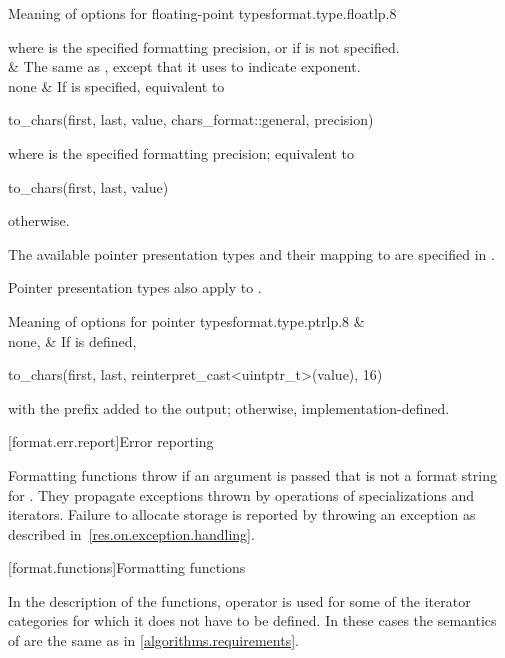 \begin{floattable}{Meaning of  options for floating-point types}{format.type.float}{lp{.8\hsize}}
\begin{codeblock}
\end{codeblock}
where  is the specified formatting precision,
or  if  is not specified.
\\ \rowsep
%
 &
The same as , except that
it uses  to indicate exponent.
\\ \rowsep
%
none &
If  is specified, equivalent to
\begin{codeblock}
to_chars(first, last, value, chars_format::general, precision)
\end{codeblock}
where  is the specified formatting precision; equivalent to
\begin{codeblock}
to_chars(first, last, value)
\end{codeblock}
otherwise.
\\
\end{floattable}

\pnum
The available pointer presentation types and their mapping to
 are specified in .
\begin{note}
Pointer presentation types also apply to .
\end{note}

\begin{floattable}{Meaning of  options for pointer types}{format.type.ptr}{lp{.8\hsize}}
\topline
{} &  \\ \rowsep
none,  &
If  is defined,
\begin{codeblock}
to_chars(first, last, reinterpret_cast<uintptr_t>(value), 16)
\end{codeblock}
with the prefix  added to the output;
otherwise, implementation-defined.
\\
\end{floattable}

[format.err.report]{Error reporting}

\pnum
Formatting functions throw  if
an argument  is passed that
is not a format string for .
They propagate exceptions thrown by operations of
 specializations and iterators.
Failure to allocate storage is reported by
throwing an exception as described in~\ref{res.on.exception.handling}.

[format.functions]{Formatting functions}

\pnum
In the description of the functions, operator \tcode{+} is used
for some of the iterator categories for which it does not have to be defined.
In these cases the semantics of  are
the same as in \ref{algorithms.requirements}.

